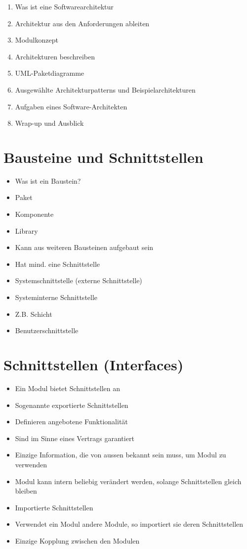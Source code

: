 \documentclass[10pt]{article}
\begin{document}
\begin{enumerate}
  \item Was ist eine Softwarearchitektur
  \item Architektur aus den Anforderungen ableiten
  \item Modulkonzept
  \item Architekturen beschreiben
  \item UML-Paketdiagramme
  \item Ausgewählte Architekturpatterns und Beispielarchitekturen
  \item Aufgaben eines Software-Architekten
  \item Wrap-up und Ausblick
\end{enumerate}

\section*{Bausteine und Schnittstellen}
\begin{itemize}
  \item Was ist ein Baustein?
  \item Paket
  \item Komponente
  \item Library
  \item Kann aus weiteren Bausteinen aufgebaut sein
  \item Hat mind. eine Schnittstelle
  \item Systemschnittstelle (externe Schnittstelle)
  \item Systeminterne Schnittstelle
  \item Z.B. Schicht
  \item Benutzerschnittstelle
\end{itemize}

\section*{Schnittstellen (Interfaces)}
\begin{itemize}
  \item Ein Modul bietet Schnittstellen an
  \item Sogenannte exportierte Schnittstellen
  \item Definieren angebotene Funktionalität
  \item Sind im Sinne eines Vertrags garantiert
  \item Einzige Information, die von aussen bekannt sein muss, um Modul zu verwenden
  \item Modul kann intern beliebig verändert werden, solange Schnittstellen gleich bleiben
  \item Importierte Schnittstellen
  \item Verwendet ein Modul andere Module, so importiert sie deren Schnittstellen
  \item Einzige Kopplung zwischen den Modulen
\end{itemize}
\end{document}
